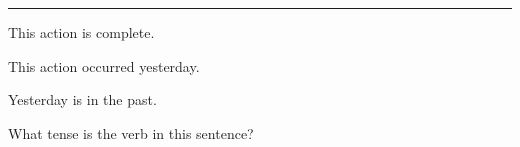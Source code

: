 \documentclass{ximera}
\begin{document}
\rule{1cm}{1pt}

\begin{question}
\begin{solution}
\begin{hint}
This action is complete.
\end{hint}
\begin{hint}
This action occurred yesterday.
\end{hint}
\begin{hint}
Yesterday is in the past.
\end{hint}
What tense is the verb in this sentence?
\end{solution}
\end{question}
\end{document}
